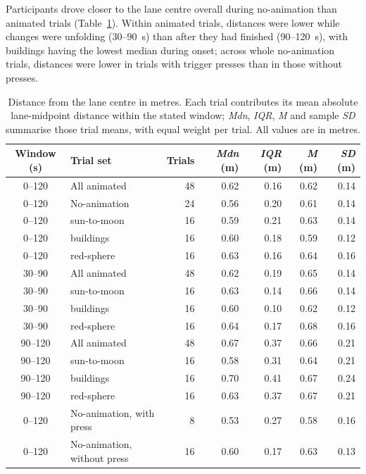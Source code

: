 \documentclass[
english,                 %
bibtex,                  %
includeExtraAbstracts, %
]{kththesis}
\newenvironment{evidenceblock}{\par\addvspace{6pt}\noindent\begin{minipage}{\linewidth}}{\end{minipage}\par\addvspace{6pt}}
\numberwithin{listing}{chapter}
\begin{document}
\begin{evidenceblock}
\normalsize
Participants drove closer to the lane centre overall during no-animation than animated trials (Table~\ref{tab:rq1-lane}). Within animated trials, distances were lower while changes were unfolding (30--90~s) than after they had finished (90--120~s), with buildings having the lowest median during onset; across whole no-animation trials, distances were lower in trials with trigger presses than in those without presses.

\begin{table}[H]
\centering
\scriptsize
\caption[Distance from the lane centre]{Distance from the lane centre in metres. Each trial contributes its mean absolute lane-midpoint distance within the stated window; \textit{Mdn}, \textit{IQR}, \textit{M} and sample \textit{SD} summarise those trial means, with equal weight per trial. All values are in metres.}
\label{tab:rq1-lane}
\setlength{\tabcolsep}{3pt}
\renewcommand{\arraystretch}{1.15}
\begin{tabularx}{\textwidth}{@{}c >{\raggedright\arraybackslash}X r r r r r@{}}
\toprule
Window (s) & Trial set & Trials & \textit{Mdn} (m) & \textit{IQR} (m) & \textit{M} (m) & \textit{SD} (m) \\
\midrule
0--120 & All animated & 48 & 0.62 & 0.16 & 0.62 & 0.14 \\
0--120 & No-animation & 24 & 0.56 & 0.20 & 0.61 & 0.14 \\
0--120 & sun-to-moon & 16 & 0.59 & 0.21 & 0.63 & 0.14 \\
0--120 & buildings & 16 & 0.60 & 0.18 & 0.59 & 0.12 \\
0--120 & red-sphere & 16 & 0.63 & 0.16 & 0.64 & 0.16 \\
\midrule
30--90 & All animated & 48 & 0.62 & 0.19 & 0.65 & 0.14 \\
30--90 & sun-to-moon & 16 & 0.63 & 0.14 & 0.66 & 0.14 \\
30--90 & buildings & 16 & 0.60 & 0.10 & 0.62 & 0.12 \\
30--90 & red-sphere & 16 & 0.64 & 0.17 & 0.68 & 0.16 \\
\midrule
90--120 & All animated & 48 & 0.67 & 0.37 & 0.66 & 0.21 \\
90--120 & sun-to-moon & 16 & 0.58 & 0.31 & 0.64 & 0.21 \\
90--120 & buildings & 16 & 0.70 & 0.41 & 0.67 & 0.24 \\
90--120 & red-sphere & 16 & 0.63 & 0.37 & 0.67 & 0.21 \\
\midrule
0--120 & No-animation, with press & 8 & 0.53 & 0.27 & 0.58 & 0.16 \\
0--120 & No-animation, without press & 16 & 0.60 & 0.17 & 0.63 & 0.13 \\
\bottomrule
\end{tabularx}
\end{table}
\end{evidenceblock}
\end{document}
